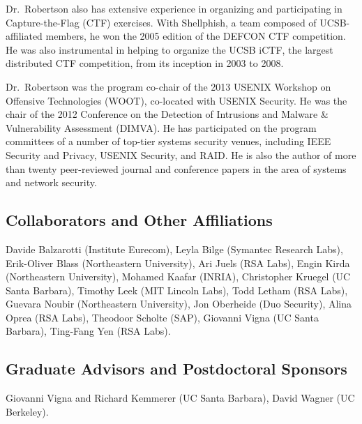 \documentclass[letterpaper,11pt]{scrartcl}
\begin{document}
Dr.~Robertson also has extensive experience in organizing and participating in
Capture-the-Flag (CTF) exercises.  With Shellphish, a team composed of
UCSB-affiliated members, he won the 2005 edition of the DEFCON CTF
competition.  He was also instrumental in helping to organize the UCSB iCTF,
the largest distributed CTF competition, from its inception in 2003 to 2008.

Dr.~Robertson was the program co-chair of the 2013 USENIX Workshop on
Offensive Technologies (WOOT), co-located with USENIX Security.  He was the
chair of the 2012 Conference on the Detection of Intrusions and Malware \&
Vulnerability Assessment (DIMVA).  He has participated on the program
committees of a number of top-tier systems security venues, including IEEE
Security and Privacy, USENIX Security, and RAID.  He is also the author of
more than twenty peer-reviewed journal and conference papers in the area of
systems and network security.

\subsection*{Collaborators and Other Affiliations}

\noindent%
Davide Balzarotti (Institute Eurecom),
Leyla Bilge (Symantec Research Labs),
Erik-Oliver Blass (Northeastern University),
Ari Juels (RSA Labs),
Engin Kirda (Northeastern University),
Mohamed Kaafar (INRIA),
Christopher Kruegel (UC Santa Barbara),
Timothy Leek (MIT Lincoln Labs),
Todd Letham (RSA Labs),
Guevara Noubir (Northeastern University),
Jon Oberheide (Duo Security),
Alina Oprea (RSA Labs),
Theodoor Scholte (SAP),
Giovanni Vigna (UC Santa Barbara),
Ting-Fang Yen (RSA Labs).

\subsection*{Graduate Advisors and Postdoctoral Sponsors}

Giovanni Vigna and Richard Kemmerer (UC Santa Barbara), David Wagner (UC Berkeley).
\end{document}
